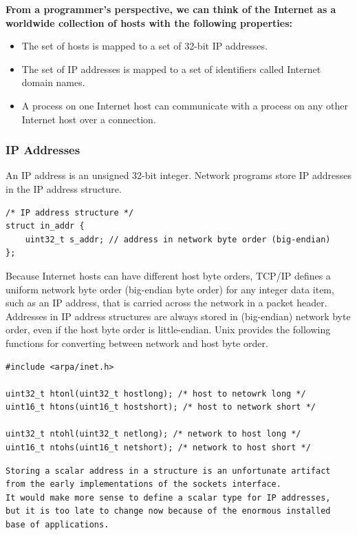 \documentclass[11pt]{article}
\begin{document}
\textbf{From a programmer’s perspective, we can think of the Internet as a worldwide collection of hosts with the following properties:}\\
\begin{itemize}
\item The set of hosts is mapped to a set of 32-bit IP addresses.\\
\item The set of IP addresses is mapped to a set of identifiers called Internet domain names.\\
\item A process on one Internet host can communicate with a process on any other Internet host over a connection.\\
\end{itemize}



\subsubsection{IP Addresses}
\label{sec:orgb2b1fd6}
An IP address is an unsigned 32-bit integer. Network programs store IP addresses in the IP address structure.\\
\begin{verbatim}
/* IP address structure */
struct in_addr {
    uint32_t s_addr; // address in network byte order (big-endian) 
};
\end{verbatim}
Because Internet hosts can have different host byte orders, TCP/IP defines a uniform network byte order (big-endian byte order) for any integer data item, such as an IP address, that is carried across the network in a packet header. Addresses in IP address structures are always stored in (big-endian) network byte order, even if the host byte order is little-endian. Unix provides the following functions for converting between network and host byte order.\\

\begin{verbatim}
#include <arpa/inet.h>

uint32_t htonl(uint32_t hostlong); /* host to netowrk long */
uint16_t htons(uint16_t hostshort); /* host to network short */

uint32_t ntohl(uint32_t netlong); /* network to host long */
uint16_t ntohs(uint16_t netshort); /* network to host short */
\end{verbatim}


\begin{verbatim}
Storing a scalar address in a structure is an unfortunate artifact 
from the early implementations of the sockets interface. 
It would make more sense to define a scalar type for IP addresses, 
but it is too late to change now because of the enormous installed 
base of applications.
\end{verbatim}
\end{document}
